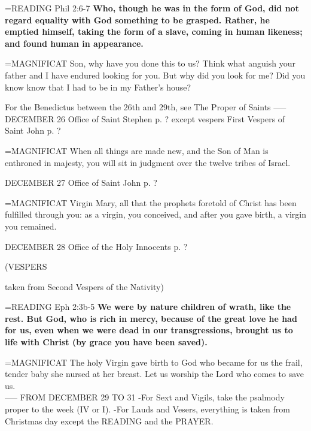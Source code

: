 \hangindent=\parindent \small{READING}    Phil 2:6-7 \textbf{   Who, though he was in the form of God, did not regard equality with God something to be grasped. Rather, he emptied himself, taking the form of a slave, coming in human likeness; and found human in appearance.\\}

\hangindent=\parindent \small{MAGNIFICAT 	Son, why have you done this to us? Think what anguish your father and I have endured looking for you. But why did you look for me? Did you know know that I had to be in my Father's house?\\}

For the Benedictus between the 26th and 29th, see The Proper of Saints
-----
DECEMBER 26
Office of Saint Stephen p. ? except vespers
First Vespers of Saint John p. ?

\hangindent=\parindent \small{MAGNIFICAT 	When all things are made new, and the Son of Man is enthroned in majesty, you will sit in judgment over the twelve tribes of Israel.\\}

DECEMBER 27
Office of Saint John p. ?

\hangindent=\parindent \small{MAGNIFICAT 	Virgin Mary, all that the prophets foretold of Christ has been fulfilled through you: as a virgin, you conceived, and after you gave birth, a virgin you remained.\\}

DECEMBER 28
Office of the Holy Innocents p. ?
\begin{flushleft}\normalsize (VESPERS\\\end{flushleft} taken from Second Vespers of the Nativity)

\hangindent=\parindent \small{READING}    Eph 2:3b-5 \textbf{   We were by nature children of wrath, like the rest. But God, who is rich in mercy, because of the great love he had for us, even when we were dead in our transgressions, brought us to life with Christ (by grace you have been saved).\\}

\hangindent=\parindent \small{MAGNIFICAT 	The holy Virgin gave birth to God who became for us the frail, tender baby she nursed at her breast. Let us worship the Lord who comes to save us.\\}
-----
FROM DECEMBER 29 TO 31
-For Sext and Vigils, take the psalmody proper to the week (IV or I).
-For Lauds and Vesers, everything is taken from Christmas day except the READING and the PRAYER.

